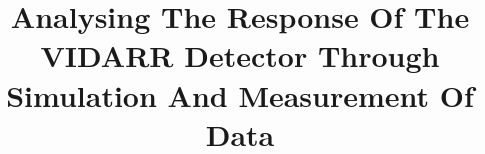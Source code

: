\usepackage{graphicx}
\graphicspath{{Fig/}}
\usepackage[parfill]{parskip}
\usepackage{rotating}

\title{Analysing The Response Of The VIDARR Detector Through Simulation And Measurement Of Data}









     
